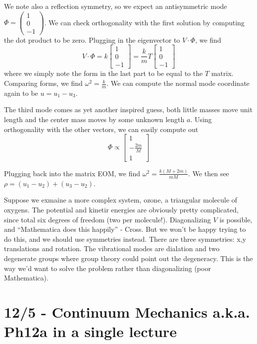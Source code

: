 \documentclass[10pt]{report}
\begin{document}
We note also a reflection symmetry, so we expect an antisymmetric mode $\Phi = \begin{pmatrix} 1\\0\\-1 \end{pmatrix} $. We can check orthogonality with the first solution by computing the dot product to be zero. Plugging in the eigenvector to $V\cdot \Phi$, we find
$$V\cdot \Phi = k\begin{bmatrix} 1\\0\\-1 \end{bmatrix} =\frac{k}{m}T\begin{bmatrix} 1\\0\\-1 \end{bmatrix} $$
where we simply note the form in the last part to be equal to the $T$ matrix. Comparing forms, we find $\omega^2 = \frac{k}{m}$. We can compute the normal mode coordinate again to be $u = u_1 - u_3$.

The third mode comes as yet another inspired guess, both little masses move unit length and the center mass moves by some unknown length $a$. Using orthogonality with the other vectors, we can easily compute out 
$$\Phi \propto \begin{bmatrix} 1\\-\frac{2m}{M}\\1 \end{bmatrix}$$

Plugging back into the matrix EOM, we find $\omega^2 = \frac{k(M+2m)}{mM}$. We then see $\rho = (u_1 - u_2) + (u_3 - u_2)$. 

Suppose we exmaine a more complex system, ozone, a triangular molecule of oxygens. The potential and kinetir energies are obviously pretty complicated, since total six degrees of freedom (two per molecule!). Diagonalizing $V$ is possible, and ``Mathematica does this happily'' - Cross. But we won't be happy trying to do this, and we should use symmetries instead. There are three symmetries: x,y translations and rotation. The vibrational modes are dialation and two degenerate groups where group theory could point out the degeneracy. This is the way we'd want to solve the problem rather than diagonalizing (poor Mathematica).

\chapter{12/5 - Continuum Mechanics a.k.a. Ph12a in a single lecture}
\end{document}
